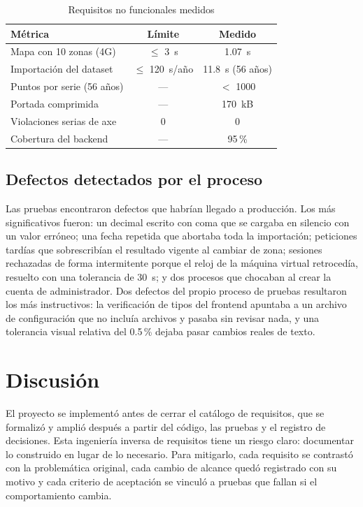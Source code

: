 \documentclass[conference,a4paper]{IEEEtran}
\begin{document}
\begin{table}[!t]
\centering
\caption{Requisitos no funcionales medidos}
\label{tab:rnf}
\footnotesize
\begin{tabular}{@{}L{3.2cm}cc@{}}
\toprule
\textbf{Métrica} & \textbf{Límite} & \textbf{Medido}\\
\midrule
Mapa con 10 zonas (4G) & $\le$ \SI{3}{s} & \SI{1.07}{s}\\
Importación del dataset & $\le$ \SI{120}{s}/año & \SI{11.8}{s} (56 años)\\
Puntos por serie (56 años) & --- & $<$ \num{1000}\\
Portada comprimida & --- & \SI{170}{kB}\\
Violaciones serias de axe & 0 & 0\\
Cobertura del backend & --- & 95\,\%\\
\bottomrule
\end{tabular}
\end{table}

\subsection{Defectos detectados por el proceso}
Las pruebas encontraron defectos que habrían llegado a producción. Los más significativos fueron: un decimal escrito con coma que se cargaba en silencio con un valor erróneo; una fecha repetida que abortaba toda la importación; peticiones tardías que sobrescribían el resultado vigente al cambiar de zona; sesiones rechazadas de forma intermitente porque el reloj de la máquina virtual retrocedía, resuelto con una tolerancia de \SI{30}{s}; y dos procesos que chocaban al crear la cuenta de administrador. Dos defectos del propio proceso de pruebas resultaron los más instructivos: la verificación de tipos del frontend apuntaba a un archivo de configuración que no incluía archivos y pasaba sin revisar nada, y una tolerancia visual relativa del 0.5\,\% dejaba pasar cambios reales de texto.

\section{Discusión}\label{sec:disc}

El proyecto se implementó antes de cerrar el catálogo de requisitos, que se formalizó y amplió después a partir del código, las pruebas y el registro de decisiones. Esta ingeniería inversa de requisitos tiene un riesgo claro: documentar lo construido en lugar de lo necesario. Para mitigarlo, cada requisito se contrastó con la problemática original, cada cambio de alcance quedó registrado con su motivo y cada criterio de aceptación se vinculó a pruebas que fallan si el comportamiento cambia.
\end{document}
